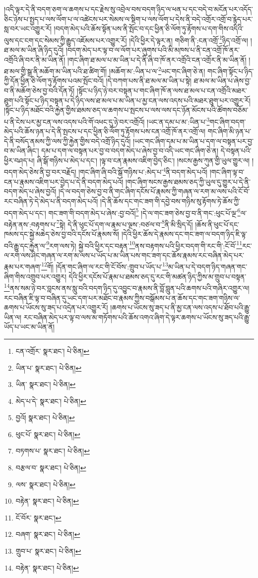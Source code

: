 །འདི་ལྟར་དེ་ནི་བདག་ཅག་ལ་ཆགས་པ་དང་རྗེས་སུ་འབྲེལ་བས་བདག་ཉིད་ལ་ཕན་པ་དང་བདེ་བ་མངོན་པར་འདོད་ཅིང་ཉེས་པ་སྤྱད་པ་ལས་ལོག་པ་ལ་འཚེངས་པར་སེམས་ལ་སྡིག་པ་ལས་ལོག་པ་དེས་ནི་བདེ་འགྲོར་འགྲོ་བ་རྙེད་པར་སླ་བར་ཡང་འགྱུར་རོ། །བདག་མེད་པའི་ཆོས་སྟོན་པས་ནི་སྤོང་བ་དང་ཕྱིན་ཅི་ལོག་ཏུ་རྟོགས་པ་དག་གིས་འདིའི་ལུས་དང་ངག་དང་སེམས་ཀྱི་རྒྱུད་འཇོམས་པར་འགྱུར་རོ། །དེའི་ཕྱིར་དེ་ལྟར་ན། གཅིག་ནི་:ངན་འགྲོ་\footnote{ངན་འགྲོར་  སྣར་ཐང་།  པེ་ཅིན། }ཉིད་འགྲོ་ལ། །ཐ་མལ་མ་ཡིན་ཞི་ཉིད་དུའོ། །བདག་མེད་པར་ལྟ་བ་ལ་ལོག་པར་ཞུགས་པའི་མི་མཁས་པ་ནི་ངན་འགྲོ་ཁོ་ནར་འགྲོའི་ཞི་བར་ནི་མ་ཡིན་ནོ། །གང་ཞིག་ཐ་མལ་པ་མ་ཡིན་པ་དེ་ནི་ཞི་བ་ཁོ་ནར་འགྲོའི་ངན་འགྲོར་ནི་མ་ཡིན་ནོ། །
ཐ་མལ་གྱི་སྒྲ་ནི་མཆོག་མ་ཡིན་པའི་ཐ་ཚིག་གོ། །མཆོག་མ་:ཡིན་པ་ལ་\footnote{ཡིན་པ་  སྣར་ཐང་།  པེ་ཅིན། }ཡང་གང་ཞིག་ཅེ་ན། གང་ཞིག་སྟོང་པ་ཉིད་ཀྱི་དོན་ཕྱིན་ཅི་ལོག་ཏུ་རྟོགས་པའམ་སྤོང་བའོ། །དེ་བཀག་པས་ནི་ཐ་མལ་མ་ཡིན་པ་སྟེ། ཐ་མལ་མ་ཡིན་པ་ཞེས་བྱ་བ་ནི་མཆོག་ཅེས་བྱ་བའི་དོན་ཏོ། །སྟོང་པ་ཉིད་ཉེ་བར་བསྟན་པ་གང་ཞིག་ཁོ་ན་ལས་ཐ་མལ་པ་ངན་འགྲོའི་མཐར་ཐུག་པའི་སྟོང་པ་ཉིད་བསྟན་པ་དེ་ཉིད་ལས་ཐ་མལ་པ་མ་ཡིན་པ་མྱ་ངན་ལས་འདས་པའི་མཐར་ཐུག་པར་འགྱུར་རོ། །སྟོང་པ་ཉིད་མཐོང་བའི་རྐྱེན་གྱིས་ཐམས་ཅད་ལ་ཆགས་པ་སྤངས་པ་ལས་ལས་དང་ཉོན་མོངས་པའི་ཚོགས་བཅོམ་པ་ནི་ངེས་པར་མྱ་ངན་ལས་འདས་པའི་གོ་འཕང་དུ་ཉེ་བར་འགྲོའོ། །ཡང་ན་དམ་པ་མ་:ཡིན་པ་\footnote{ཡིན་  སྣར་ཐང་།  པེ་ཅིན། }གང་ཞིག་བདག་མེད་པའི་ཆོས་ཉན་པ་དེ་ནི་སྤངས་པ་དང་ཕྱིན་ཅི་ལོག་ཏུ་རྟོགས་པས་ངན་འགྲོ་ཁོ་ནར་འགྲོ་ལ། གང་ཞིག་མི་ཉན་པ་དེ་ནི་བསོད་ནམས་ཀྱི་ལས་ཀྱི་རྐྱེན་གྱིས་བདེ་འགྲོ་ཉིད་དུའོ། །ཡང་གང་ཞིག་དམ་པ་མ་ཡིན་པ་དག་ལ་བསྟན་པར་བྱ་བ་མ་ཡིན་ཞིང་། དམ་པ་དག་ལ་བསྟན་པར་བྱ་བ་བདག་མེད་པ་ཞེས་བྱ་བ་འདི་ཡང་གང་ཞིག་ཅེ་ན། དེ་བསྟན་པའི་ཕྱིར་བཤད་པ། ཞི་སྒོ་གཉིས་པ་མེད་པ་དང་། །ལྟ་བ་ངན་རྣམས་འཇིག་བྱེད་ཅིང་། །སངས་རྒྱས་ཀུན་གྱི་ཡུལ་གྱུར་ལ། །བདག་མེད་ཅེས་ནི་བྱ་བར་བརྗོད། །གང་ཞིག་ཞི་བའི་སྒོ་གཉིས་པ་:མེད་པ་\footnote{མེད་པ་དེ་  སྣར་ཐང་།  པེ་ཅིན། }ནི་བདག་མེད་པའོ། །གང་ཞིག་ལྟ་བ་ངན་པ་རྣམས་འཇིག་པར་བྱེད་པ་དེ་ནི་བདག་མེད་པའོ། །གང་ཞིག་སངས་རྒྱས་ཐམས་ཅད་ཀྱི་ཡུལ་དུ་གྱུར་པ་དེ་ནི་བདག་མེད་པ་ཞེས་བྱའོ། །དེ་ལ་བདག་ཅེས་བྱ་བ་ནི་གང་ཞིག་དངོས་པོ་རྣམས་ཀྱི་གཞན་ལ་རག་མ་ལས་པའི་ངོ་བོ་རང་བཞིན་ཏེ་དེ་མེད་པ་ནི་བདག་མེད་པའོ། །དེ་ནི་ཆོས་དང་གང་ཟག་གི་དབྱེ་བས་གཉིས་སུ་རྟོགས་ཏེ་ཆོས་ཀྱི་བདག་མེད་པ་དང་། གང་ཟག་གི་བདག་མེད་པ་ཞེས་:བྱ་བའོ།\footnote{བྱའོ།  སྣར་ཐང་།  པེ་ཅིན། } །དེ་ལ་གང་ཟག་ཅེས་བྱ་བ་ནི་གང་:ཕུང་པོ་ལྔ་\footnote{ཕུང་པོ་  སྣར་ཐང་།  པེ་ཅིན། }ལ་བརྟེན་ནས་:བརྟགས་པ་\footnote{བཏགས་པ་  སྣར་ཐང་།  པེ་ཅིན། }སྟེ། དེ་ནི་ཕུང་པོ་དག་ལ་རྣམ་པ་ལྔས་:བཙལ་བ་\footnote{བརྩལ་བ་  སྣར་ཐང་།  པེ་ཅིན། }ནི་མི་སྲིད་དོ། །ཆོས་ནི་ཕུང་པོ་དང་ཁམས་དང་སྐྱེ་མཆེད་ཅེས་བྱ་བའི་དངོས་པོ་རྣམས་སོ། །དེའི་ཕྱིར་ཆོས་དེ་རྣམས་དང་གང་ཟག་ལ་བདག་ཉིད་ཇི་ལྟ་བའི་རྒྱུ་དང་རྐྱེན་ལ་\footnote{ལས་  སྣར་ཐང་།  པེ་ཅིན། }རག་ལས་ཏེ། སྐྱེ་བའི་ཕྱིར་དང་བརྟན་\footnote{བརྟེན་  སྣར་ཐང་།  པེ་ཅིན། }ནས་བརྟགས་པའི་ཕྱིར་བདག་གི་རང་གི་:ངོ་བོ་\footnote{ངོ་བོར་  སྣར་ཐང་། }རང་ལ་རག་ལས་ཤིང་གཞན་ལ་རག་མ་ལས་པ་ཡོད་པ་མ་ཡིན་པས་གང་ཟག་དང་ཆོས་རྣམས་རང་བཞིན་མེད་པར་རྣམ་པར་གཞག་\footnote{བཞག་  སྣར་ཐང་།  པེ་ཅིན། }གོ། །དོན་གང་ཞིག་ལ་རང་གི་ངོ་བོས་:གྲུབ་པ་ཡོད་པ་\footnote{གྲུབ་པ་  སྣར་ཐང་།  པེ་ཅིན། }མ་ཡིན་པ་དེ་བདག་ཉིད་གཞན་གང་ཞིག་གིས་འགྲུབ་པར་འགྱུར། དེའི་ཕྱིར་དངོས་པོ་རྣམ་པ་ཐམས་ཅད་དུ་རང་གི་མཚན་ཉིད་ཀྱིས་མ་གྲུབ་པ་བསྟན་\footnote{བརྟེན་  སྣར་ཐང་།  པེ་ཅིན། }ནས་སམ་ཉེ་བར་བླངས་ནས་སླུ་བའི་བདག་ཉིད་དུ་འབྱུང་བ་རྣམས་ནི་བློ་བླུན་པའི་ཆགས་པའི་གཞིར་འགྱུར་ལ། རང་བཞིན་ཇི་ལྟ་བ་བཞིན་དུ་ཡང་དག་པར་མཐོང་བ་རྣམས་ཀྱིས་བསྒོམས་པ་ན་ཆོས་དང་གང་ཟག་གཉིས་ལ་ཆགས་པ་ཡོངས་སུ་ཟད་པ་འདྲེན་པར་འགྱུར་རོ། །ཆགས་པ་ཡོངས་སུ་ཟད་པ་ནི་མྱ་ངན་ལས་འདས་པ་ཐོབ་པའི་རྒྱུ་ཡིན་ལ། རང་བཞིན་མེད་པར་ལྟ་བ་ལས་མ་གཏོགས་པའི་ཆོས་འགའ་ཞིག་དེ་ལྟར་ཆགས་པ་ཡོངས་སུ་ཟད་པའི་རྒྱུ་ཡོད་པ་ཡང་མ་ཡིན་ནོ། 
